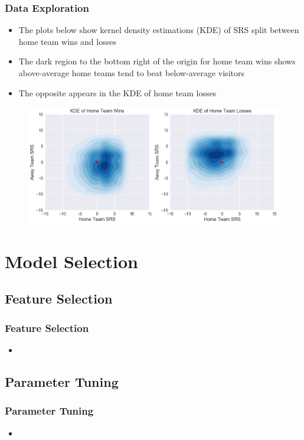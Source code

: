 \documentclass{beamer}
\begin{document}
\begin{frame}
\frametitle{Data Exploration}
\begin{itemize}
    \item The plots below show kernel density estimations (KDE) of SRS split between home team wins and losses
    \item The dark region to the bottom right of the origin for home team wins shows above-average home teams tend to beat below-average visitors
    \item The opposite appears in the KDE of home team losses
\end{itemize}
\begin{figure}
\includegraphics[scale=0.35]{../docs/assets/images/data-exploration/srs-win-loss-kde.png}
\end{figure}
\end{frame}

\section{Model Selection}

\subsection{Feature Selection}
\begin{frame}
\frametitle{Feature Selection}
\begin{itemize}
    \item
\end{itemize}
\end{frame}

\subsection{Parameter Tuning}
\begin{frame}
\frametitle{Parameter Tuning}
\begin{itemize}
    \item
\end{itemize}
\end{frame}
\end{document}
